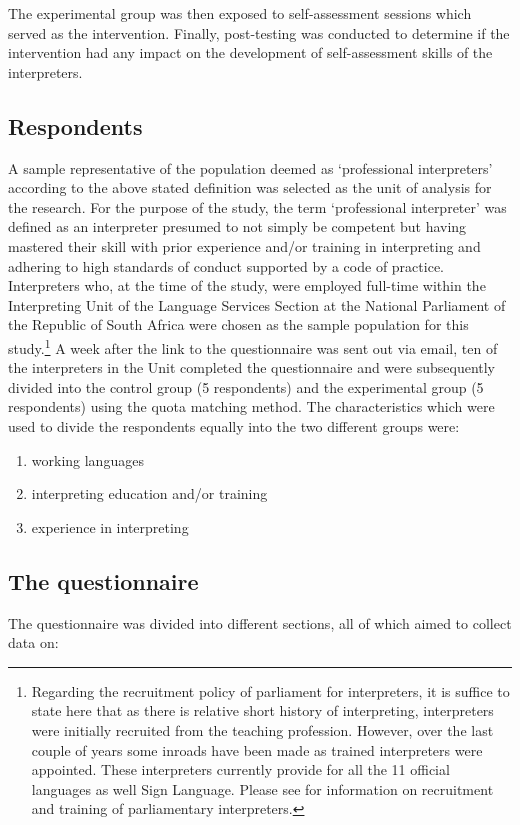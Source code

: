 \documentclass[output=paper]{langsci/langscibook}
\begin{document}
The experimental group was then exposed to self-assessment sessions which served as the intervention. Finally, post-testing was conducted to determine if the intervention had any impact on the development of self-assessment skills of the interpreters.

\subsection{Respondents}
A sample representative of the population deemed as ‘professional interpreters’ according to the above stated definition was selected as the unit of analysis for the research. For the purpose of the study, the term ‘professional interpreter’ was defined as an interpreter presumed to not simply be competent but having mastered their skill with prior experience and/or training in interpreting and adhering to high standards of conduct supported by a code of practice. Interpreters who, at the time of the study, were employed full-time within the Interpreting Unit of the Language Services Section at the National Parliament of the Republic of South Africa were chosen as the sample population for this study.\footnote{Regarding the recruitment policy of parliament for interpreters, it is suffice to state here that as there is relative short history of interpreting, interpreters were initially recruited from the teaching profession. However, over the last couple of years some inroads have been made as trained interpreters were appointed. These interpreters currently provide for all the 11 official languages as well Sign Language.  Please see \citet{Lesch2010} for information on recruitment and training of parliamentary interpreters.} A week after the link to the questionnaire was sent out via email, ten of the interpreters in the Unit completed the questionnaire and were subsequently divided into the control group (5 respondents) and the experimental group (5 respondents) using the quota matching method.  The characteristics which were used to divide the respondents equally into the two different groups were: 

\begin{enumerate}
\item working languages 
\item interpreting education and/or training 
\item experience in interpreting
\end{enumerate}

\subsection{The questionnaire}\label{sec:deysel:3.3}
The questionnaire was divided into different sections, all of which aimed to collect data on:
\end{document}
